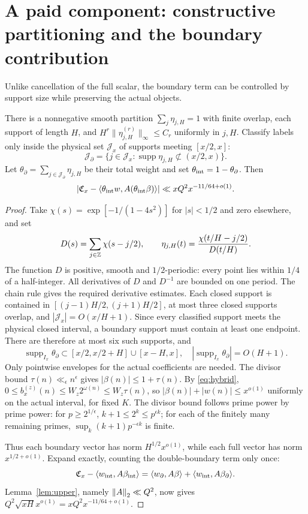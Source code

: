 \section{A paid component: constructive partitioning and the boundary contribution}\label{sec:boundary}
Unlike cancellation of the full scalar, the boundary term can be controlled by support size while preserving the actual objects\cite{archivephysical}.
\begin{theorem}\label{thm:boundary}
There is a nonnegative smooth partition $\sum_j\eta_{j,H}=1$ with finite overlap, each support of length $H$, and
$H^r\|\eta_{j,H}^{(r)}\|_\infty\le C_r$ uniformly in $j,H$.
Classify labels only inside the physical set $\mathcal J_x$ of supports meeting $[x/2,x]$:
\[
\mathcal J_\partial=\{j\in\mathcal J_x:\operatorname{supp}\eta_{j,H}\not\subset(x/2,x)\}.
\]
Let $\theta_\partial=\sum_{j\in\mathcal J_\partial}\eta_{j,H}$ be their total weight and set $\theta_{\rm int}=1-\theta_\partial$. Then
\[
\left|\mathfrak C_x-\langle \theta_{\rm int}w,A(\theta_{\rm int}\beta)\rangle\right|
\ll xQ^2x^{-11/64+o(1)}.
\]
\end{theorem}
\begin{proof}
Take $\chi(s)=\exp[-1/(1-4s^2)]$ for $|s|<1/2$ and zero elsewhere, and set
\[
D(s)=\sum_{j\in\mathbb Z}\chi(s-j/2),\qquad
\eta_{j,H}(t)=\frac{\chi(t/H-j/2)}{D(t/H)}.
\]
The function $D$ is positive, smooth and $1/2$-periodic: every point lies within $1/4$ of a half-integer. All derivatives of $D$ and $D^{-1}$ are bounded on one period. The chain rule gives the required derivative estimates.
Each closed support is contained in $[(j-1)H/2,(j+1)H/2]$, at most three closed supports overlap, and $|\mathcal J_x|=O(x/H+1)$.
Since every classified support meets the physical closed interval, a boundary support must contain at least one endpoint. There are therefore at most six such supports, and
\[
\operatorname{supp}_{I_x}\theta_\partial
\subset [x/2,x/2+H]\cup[x-H,x],
\quad |\operatorname{supp}_{I_x}\theta_\partial|=O(H+1).
\]
Only pointwise envelopes for the actual coefficients are needed. The divisor bound $\tau(n)\ll_\epsilon n^\epsilon$ gives $|\beta(n)|\le1+\tau(n)$.
By \eqref{eq:hybrid}, $0\le b_x^{(z)}(n)\le W_z2^{\omega(n)}\le W_z\tau(n)$, so
$|\beta(n)|+|w(n)|\le x^{o(1)}$ uniformly on the actual interval, for fixed $K$.
The divisor bound follows prime power by prime power: for $p\ge2^{1/\epsilon}$,
$k+1\le2^k\le p^{\epsilon k}$; for each of the finitely many remaining primes,
$\sup_k(k+1)p^{-\epsilon k}$ is finite.

Thus each boundary vector has norm $H^{1/2}x^{o(1)}$, while each full vector has norm $x^{1/2+o(1)}$.
Expand exactly, counting the double-boundary term only once:
\[
\mathfrak C_x-\langle w_{\rm int},A\beta_{\rm int}\rangle
=\langle w_\partial,A\beta\rangle+\langle w_{\rm int},A\beta_\partial\rangle.
\]
Lemma~\ref{lem:upper}, namely $\left\|A\right\|_2\ll Q^2$, now gives
$Q^2\sqrt{xH}x^{o(1)}=xQ^2x^{-11/64+o(1)}$.
\end{proof}
